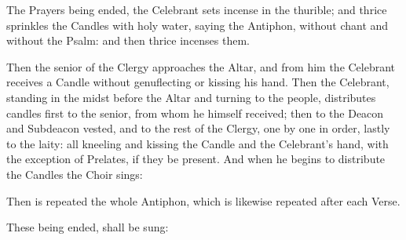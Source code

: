 \begin{rubric}
    The Prayers being ended, the Celebrant sets incense in the thurible; and thrice sprinkles the Candles with holy water, saying the Antiphon,  without chant and without the Psalm: and then thrice incenses them.
\end{rubric}
\begin{rubric}
    Then the senior of the Clergy approaches the Altar, and from him the Celebrant receives a Candle without genuflecting or kissing his hand. Then the Celebrant, standing in the midst before the Altar and turning to the people, distributes candles first to the senior, from whom he himself received; then to the Deacon and Subdeacon vested, and to the rest of the Clergy, one by one in order, lastly to the laity: all kneeling and kissing the Candle and the Celebrant's hand, with the exception of Prelates, if they be present. And when he begins to distribute the Candles the Choir sings:
\end{rubric}



\begin{rubric}
    Then is repeated the whole Antiphon,  which is likewise repeated after each Verse.
\end{rubric}





\begin{rubric}
    These being ended, shall be sung:
\end{rubric}



